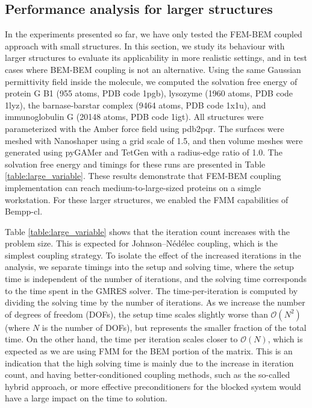 \subsection*{\sffamily \large Performance analysis for larger structures}

In the experiments presented so far, we have only tested the FEM-BEM coupled approach with small structures. In this section, we study its behaviour with larger structures to evaluate its applicability in more realistic settings, and in test cases where BEM-BEM coupling is not an alternative. Using the same Gaussian permittivity field inside the molecule, we computed the solvation free energy of protein G B1 (955 atoms, PDB code 1pgb), lysozyme (1960 atoms, PDB code 1lyz), the barnase-barstar complex (9464 atoms, PDB code 1x1u), and immunoglobulin G (20148 atoms, PDB code 1igt). All structures were parameterized with the Amber\cite{Swanson05} force field using pdb2pqr.\cite{Dolinsky04} The surfaces were meshed with Nanoshaper\cite{decherchi2013general} using a grid scale of 1.5, and then volume meshes were generated using pyGAMer\cite{lee2020open} and TetGen\cite{hang2015tetgen} with a radius-edge ratio of 1.0. The solvation free energy and timings for these runs are presented in Table \ref{table:large_variable}. These results demonstrate that FEM-BEM coupling implementation can reach medium-to-large-sized proteins on a simgle workstation. For these larger structures, we enabled the FMM capabilities of Bempp-cl.

Table \ref{table:large_variable} shows that the iteration count increases with the problem size. This is expected for Johnson--N\'ed\'elec coupling, which is the simplest coupling strategy. To isolate the effect of the increased iterations in the analysis, we separate timings into the setup and solving time, where the setup time is independent of the number of iterations, and the solving time corresponds to the time spent in the GMRES solver. The time-per-iteration is computed by dividing the solving time by the number of iterations.
As we increase the number of degrees of freedom (DOFs), the setup time scales slightly worse than $\mathcal{O}(N^2)$ (where $N$ is the number of DOFs), but represents the smaller fraction of the total time.
On the other hand, the time per iteration scales closer to $\mathcal{O}(N)$, which is expected as we are using FMM for the BEM portion of the matrix.
This is an indication that the high solving time is mainly due to the increase in iteration count, and having better-conditioned coupling methods, such as the so-called hybrid approach\cite{betcke2022hybrid}, or more effective preconditioners for the blocked system would have a large impact on the time to solution.

